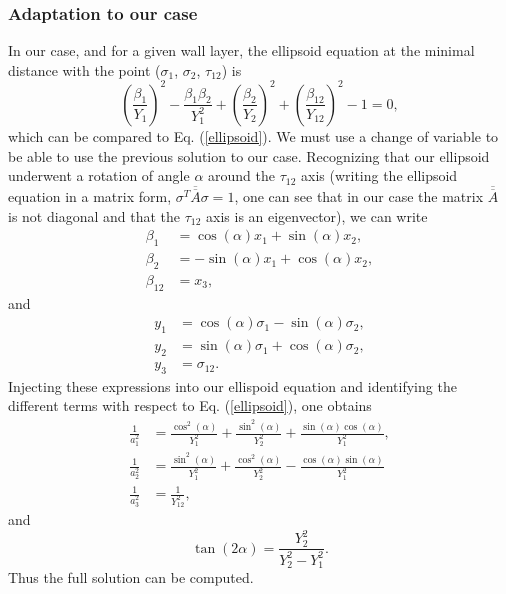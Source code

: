 \documentclass[]{article}
\begin{document}
\subsubsection{Adaptation to our case}
In our case, and for a given wall layer, the ellipsoid equation at the minimal distance with the point ($\sigma_1$, $\sigma_2$, $\tau_{12}$) is
\begin{equation}
		\left(\frac{\beta_1}{Y_1}\right)^2 - \frac{\beta_1 \beta_2}{Y_1^2} + \left(\frac{\beta_2}{Y_2}\right)^2 + \left(\frac{\beta_{12}}{Y_{12}}\right)^2 -1=0,
\end{equation}
which can be compared to Eq. (\ref{ellipsoid}).
We must use a change of variable to be able to use the previous solution to our case. Recognizing that our ellipsoid underwent a rotation of angle $\alpha$ around the $\tau_{12}$ axis (writing the ellipsoid equation in a matrix form, $\sigma^T\overline{\overline{A}}\sigma=1$, one can see that in our case the matrix $\overline{\overline{A}}$ is not diagonal and that the $\tau_{12}$ axis is an eigenvector), we can write
\begin{align}
	\beta_1 &= \cos(\alpha) x_1 + \sin({\alpha}) x_2, \nonumber \\
	\beta_2 &= -\sin(\alpha) x_1 + \cos(\alpha) x_2,  \\
	\beta_{12} &= x_3, \nonumber 
\end{align}
and
\begin{align}
	y_1 &= \cos(\alpha) \sigma_1 - \sin({\alpha}) \sigma_2, \nonumber \\
	y_2 &= \sin(\alpha) \sigma_1 + \cos(\alpha) \sigma_2,  \\
	y_3 &= \sigma_{12}. \nonumber 
\end{align}
Injecting these expressions into our ellispoid equation and identifying the different terms with respect to Eq. (\ref{ellipsoid}), one obtains
\begin{align}
	\frac{1}{a_1^2} &= \frac{\cos^2(\alpha)}{Y_1^2} + \frac{\sin^2(\alpha)}{Y_2^2}+\frac{\sin(\alpha)\cos(\alpha)}{Y_1^2}, \nonumber \\
	\frac{1}{a_2^2} &= \frac{\sin^2(\alpha)}{Y_1^2} + \frac{\cos^2(\alpha)}{Y_2^2}-\frac{\cos(\alpha)\sin(\alpha)}{Y_1^2} \\
	\frac{1}{a_3^2} &= \frac{1}{Y_{12}^2}, \nonumber 
\end{align}
and
\begin{equation}
	\tan(2\alpha)=\frac{Y_2^2}{Y_2^2-Y_1^2}.
\end{equation}
Thus the full solution can be computed.
\end{document}
